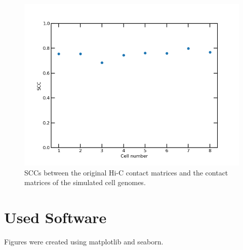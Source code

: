 \documentclass[a4paper,11pt,oneside,final,english,toc=bib,draft]{scrbook}
\newcommand{\figwidth}{12cm}
\begin{document}
\begin{figure}[ht]
\centering
  \includegraphics[width=\figwidth]{hic_vs_sim_scc.png}
  \caption{SCCs between the original Hi-C contact matrices and the contact matrices of the simulated cell genomes.}
  \label{img:hic_vs_sim_scc}
\end{figure}





\chapter{Used Software} %
\label{cha:used_software}

Figures were created using matplotlib\cite{j_d_hunter_matplotlib_2007} and seaborn\cite{waskom_seaborn_2021}.
\end{document}
